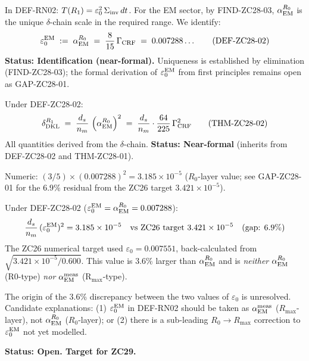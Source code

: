 \documentclass[12pt, a4paper]{article}
\begin{document}
\begin{formalbox}[title={DEF-ZC28-02: $\varepsilon_0^{\rm EM}
  := \alpha_{\rm EM}^{R_0}$ (Identification, Near-Formal)}]
In DEF-RN02: $T(R_1) = \varepsilon_0^2\,\Sigma_{\rm inv}\,dt$.
For the EM sector, by FIND-ZC28-03, $\alpha_{\rm EM}^{R_0}$
is the unique $\delta$-chain scale in the required range.
We identify:
\begin{equation}
  \varepsilon_0^{\rm EM}
  \;:=\;
  \alpha_{\rm EM}^{R_0}
  \;=\;
  \frac{8}{15}\,\Gamma_{\rm CRF}
  \;=\; 0.007288\ldots
  \tag{DEF-ZC28-02}
\end{equation}
\textbf{Status: Identification (near-formal).}
Uniqueness is established by elimination (FIND-ZC28-03);
the formal derivation of $\varepsilon_0^{\rm EM}$ from first
principles remains open as GAP-ZC28-01.
\end{formalbox}

\begin{formalbox}[title={THM-ZC28-02: THM-ZC27-01 Unconditional
  (Near-Formal)}]
Under DEF-ZC28-02:
\begin{equation}
  \delta_{\rm DKL}^{R_1}
  \;=\;
  \frac{d_s}{n_m}\,\left(\alpha_{\rm EM}^{R_0}\right)^2
  \;=\;
  \frac{d_s}{n_m}\cdot\frac{64}{225}\,\Gamma_{\rm CRF}^2
  \tag{THM-ZC28-02}
\end{equation}
All quantities derived from the $\delta$-chain.
\textbf{Status: Near-formal} (inherits from DEF-ZC28-02 and
THM-ZC28-01).

Numeric: $(3/5)\times(0.007288)^2 = 3.185\times10^{-5}$
($R_0$-layer value; see GAP-ZC28-01 for the $6.9\%$ residual
from the ZC26 target $3.421\times10^{-5}$).
\end{formalbox}

\begin{openqbox}[title={GAP-ZC28-01 (NEW v2): Exact
  $\varepsilon_0^{\rm EM}$ Reconciliation}]
\label{zc28:gap:eps0}
Under DEF-ZC28-02 ($\varepsilon_0^{\rm EM} = \alpha_{\rm EM}^{R_0}
= 0.007288$):
\[
  \frac{d_s}{n_m}\,(\varepsilon_0^{\rm EM})^2
  = 3.185\times10^{-5}
  \quad\text{vs ZC26 target } 3.421\times10^{-5}
  \quad\text{(gap: }6.9\%\text{)}
\]
The ZC26 numerical target used $\varepsilon_0 = 0.007551$,
back-calculated from $\sqrt{3.421\times10^{-5}/0.600}$.
This value is 3.6\% larger than $\alpha_{\rm EM}^{R_0}$
and is \emph{neither} $\alpha_{\rm EM}^{R_0}$ (R0-type)
\emph{nor} $\alpha_{\rm EM}^{\rm meas}$ (R$_{\max}$-type).

The origin of the 3.6\% discrepancy between the two values
of $\varepsilon_0$ is unresolved. Candidate explanations:
(1) $\varepsilon_0^{\rm EM}$ in DEF-RN02 should be taken as
$\alpha_{\rm EM}^{\rm meas}$ ($R_{\max}$-layer), not
$\alpha_{\rm EM}^{R_0}$ ($R_0$-layer); or
(2) there is a sub-leading $R_0\to R_{\max}$ correction to
$\varepsilon_0^{\rm EM}$ not yet modelled.

\textbf{Status: Open. Target for ZC29.}
\end{openqbox}
\end{document}
